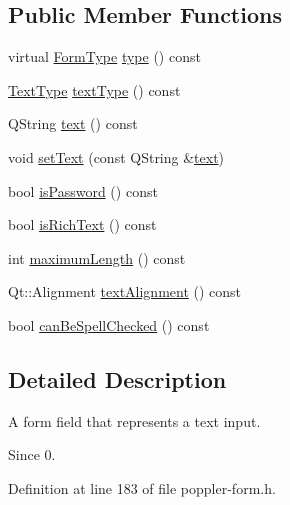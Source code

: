 \subsection*{Public Member Functions}
\begin{DoxyCompactItemize}
\item 
virtual \hyperlink{class_poppler_1_1_form_field_af9b28bf05b29780f81445b21a0ed7423}{Form\+Type} \hyperlink{class_poppler_1_1_form_field_text_a74337e7ec1ec0b4163a930212f808402}{type} () const
\item 
\hyperlink{class_poppler_1_1_form_field_text_a0d67d9badab136dba73e75d3d1d945c2}{Text\+Type} \hyperlink{class_poppler_1_1_form_field_text_aafd80a627d6986186b1fd3db3df85c24}{text\+Type} () const
\item 
Q\+String \hyperlink{class_poppler_1_1_form_field_text_aa721dbd4add8361464b9699e907ed564}{text} () const
\item 
void \hyperlink{class_poppler_1_1_form_field_text_ab67ad787fc119bdf87281d07339e310c}{set\+Text} (const Q\+String \&\hyperlink{class_poppler_1_1_form_field_text_aa721dbd4add8361464b9699e907ed564}{text})
\item 
bool \hyperlink{class_poppler_1_1_form_field_text_a35a02b24c20aa50b7c4ac7841a71d903}{is\+Password} () const
\item 
bool \hyperlink{class_poppler_1_1_form_field_text_a3c23b3b6cd48d3ac99e1ed5cf75ad314}{is\+Rich\+Text} () const
\item 
int \hyperlink{class_poppler_1_1_form_field_text_a7e5ab9c0f4cf21870f61b39caa70b940}{maximum\+Length} () const
\item 
Qt\+::\+Alignment \hyperlink{class_poppler_1_1_form_field_text_a3c1765c5816ee5f50ea3048fa9c23f3e}{text\+Alignment} () const
\item 
bool \hyperlink{class_poppler_1_1_form_field_text_af773274c028d59a376b41086b5d10e54}{can\+Be\+Spell\+Checked} () const
\end{DoxyCompactItemize}


\subsection{Detailed Description}
A form field that represents a text input.

\begin{DoxySince}{Since}
0. 
\end{DoxySince}


Definition at line 183 of file poppler-\/form.\+h.



